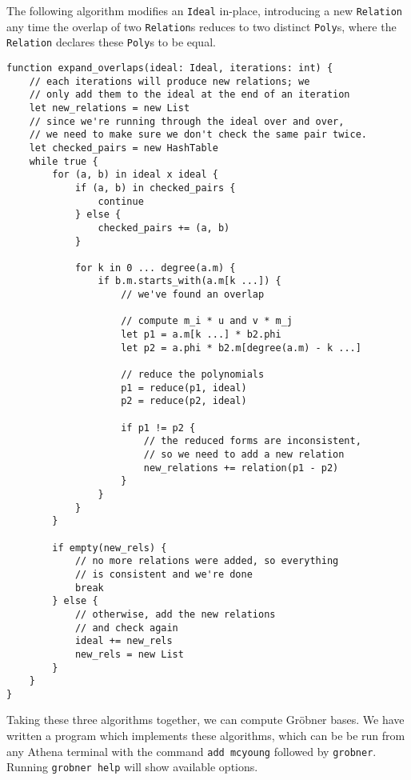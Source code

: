 \begin{alg}
    The following algorithm modifies an \verb|Ideal| in-place, introducing a new
    \verb|Relation| any time the overlap of two \verb|Relation|s reduces to two
    distinct \verb|Poly|s, where the \verb|Relation| declares these \verb|Poly|s to
    be equal.
\begin{verbatim}
function expand_overlaps(ideal: Ideal, iterations: int) {
    // each iterations will produce new relations; we 
    // only add them to the ideal at the end of an iteration
    let new_relations = new List
    // since we're running through the ideal over and over,
    // we need to make sure we don't check the same pair twice.
    let checked_pairs = new HashTable
    while true {
        for (a, b) in ideal x ideal {
            if (a, b) in checked_pairs {
                continue
            } else {
                checked_pairs += (a, b)
            }
            
            for k in 0 ... degree(a.m) {
                if b.m.starts_with(a.m[k ...]) {
                    // we've found an overlap
                    
                    // compute m_i * u and v * m_j
                    let p1 = a.m[k ...] * b2.phi
                    let p2 = a.phi * b2.m[degree(a.m) - k ...]
                    
                    // reduce the polynomials
                    p1 = reduce(p1, ideal)
                    p2 = reduce(p2, ideal)
                    
                    if p1 != p2 {
                        // the reduced forms are inconsistent, 
                        // so we need to add a new relation
                        new_relations += relation(p1 - p2)
                    }
                }
            }
        }
        
        if empty(new_rels) {
            // no more relations were added, so everything
            // is consistent and we're done
            break
        } else {
            // otherwise, add the new relations
            // and check again
            ideal += new_rels
            new_rels = new List
        }
    }
}
\end{verbatim}
\end{alg}

Taking these three algorithms together, we can compute Gr\"obner bases. We have written
a program which implements these algorithms, which can be be run from any Athena
terminal with the command \verb|add mcyoung| followed by \verb|grobner|. Running
\verb|grobner help| will show available options. 

